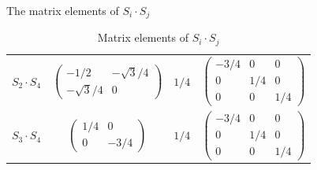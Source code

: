 \begin{frame}{The matrix elements of $S_{i}\cdot S_{j}$}
\begin{table}[htbp]
\begin{tabular}{cccc}
            $S_{2}\cdot S_{4}$ & $\begin{pmatrix}-1/2&-\sqrt{3}/4\\-\sqrt{3}/4&0\end{pmatrix}$                               & $1/4$                          & $\begin{pmatrix}-3/4&0&0\\0&1/4&0\\0&0&1/4\end{pmatrix}$                                             \\
            $S_{3}\cdot S_{4}$ & $\begin{pmatrix}1/4&0\\0&-3/4\end{pmatrix}$                               & $1/4$                          & $\begin{pmatrix}-3/4&0&0\\0&1/4&0\\0&0&1/4\end{pmatrix}$
            \\\bottomrule[1pt]
        \end{tabular}
        \caption{Matrix elements of $S_{i}\cdot S_{j}$}
    \end{table}
\end{frame}
